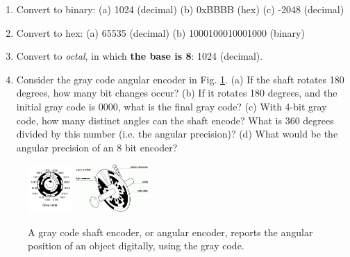 \documentclass[10pt]{article}
\begin{document}
\begin{enumerate}
\item Convert to binary: (a) 1024 (decimal) (b) 0xBBBB (hex) (c) -2048 (decimal) \\ \vspace{1.5cm}
\item Convert to hex: (a) 65535 (decimal) (b) 1000100010001000 (binary) \\ \vspace{1cm}
\item Convert to \textit{octal}, in which \textbf{the base is 8}: 1024 (decimal). \\ \vspace{1cm}
\item Consider the gray code angular encoder in Fig. \ref{fig:grayCode}.  (a) If the shaft rotates 180 degrees, how many bit changes occur?  (b) If it rotates 180 degrees, and the initial gray code is 0000, what is the final gray code?  (c) With 4-bit gray code, how many distinct angles can the shaft encode?  What is 360 degrees divided by this number (i.e. the angular precision)? (d) What would be the angular precision of an 8 bit encoder? \\ \vspace{2cm}
\end{enumerate}
\begin{figure}[hb]
\centering
\includegraphics[width=0.15\textwidth]{grayCode1.png}
\includegraphics[width=0.25\textwidth]{grayCode2.png}
\caption{\label{fig:grayCode} A gray code shaft encoder, or angular encoder, reports the angular position of an object digitally, using the gray code.}
\end{figure}
\end{document}
